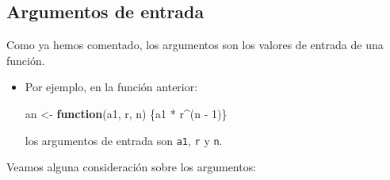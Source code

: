 \documentclass[
]{book}
\newenvironment{Shaded}{\begin{snugshade}}{\end{snugshade}}
\newcommand{\ControlFlowTok}[1]{\textcolor[rgb]{0.13,0.29,0.53}{\textbf{#1}}}
\newcommand{\DecValTok}[1]{\textcolor[rgb]{0.00,0.00,0.81}{#1}}
\newcommand{\NormalTok}[1]{#1}
\newcommand{\OtherTok}[1]{\textcolor[rgb]{0.56,0.35,0.01}{#1}}
\newcommand{\SpecialCharTok}[1]{\textcolor[rgb]{0.00,0.00,0.00}{#1}}
\theoremstyle{break}
\theoremstyle{nonumberplain}
\begin{document}
\hypertarget{argumentos-de-entrada}{%
\subsection{Argumentos de entrada}\label{argumentos-de-entrada}}

Como ya hemos comentado, los
argumentos son los valores de entrada de una función.

\begin{itemize}
\item
  Por ejemplo, en la función anterior:

\begin{Shaded}
\begin{Highlighting}[]
\NormalTok{an }\OtherTok{\textless{}{-}} \ControlFlowTok{function}\NormalTok{(a1, r, n) \{a1 }\SpecialCharTok{*}\NormalTok{ r}\SpecialCharTok{\^{}}\NormalTok{(n }\SpecialCharTok{{-}} \DecValTok{1}\NormalTok{)\}}
\end{Highlighting}
\end{Shaded}

  los argumentos de entrada son \texttt{a1}, \texttt{r} y \texttt{n}.
\end{itemize}

Veamos alguna consideración sobre los argumentos:
\end{document}
